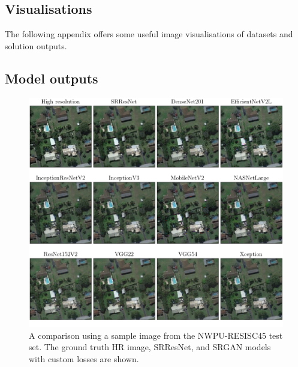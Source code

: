 \begin{appendices}
\chapter{Visualisations}
The following appendix offers some useful image visualisations of datasets and solution outputs.

\section{Model outputs}
\begin{figure}[H]
    \centering
    \includegraphics[width=\linewidth]{./assets/model_comparison.png}
    \caption{A comparison using a sample image from the NWPU-RESISC45 test set. The ground truth HR image, SRResNet, and SRGAN models with custom losses are shown.}\label{fig:model_comparison}
\end{figure}



\end{appendices}

